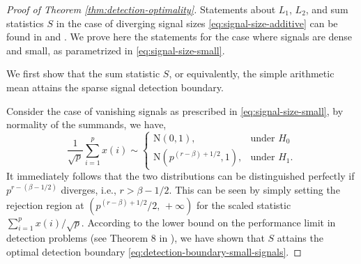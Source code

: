 \begin{proof}[Proof of Theorem \ref{thm:detection-optimality}]
Statements about $L_1$, $L_2$, and sum statistics $S$ in the case of diverging signal sizes \eqref{eq:signal-size-additive} can be found in \cite{fan1996test} and \cite{candes2018lecture}.
We prove here the statements for the case where signals are dense and small, as parametrized in \eqref{eq:signal-size-small}.

We first show that the sum statistic $S$, or equivalently, the simple arithmetic mean attains the sparse signal detection boundary.

Consider the case of vanishing signals as prescribed in \eqref{eq:signal-size-small}, by normality of the summands, we have, 
\begin{equation}
    \frac{1}{\sqrt{p}}\sum_{i=1}^p x(i) \sim 
    \begin{cases}
    \mathrm{N}(0, 1), & \text{under } H_0\\
    \mathrm{N}(p^{(r-\beta)+1/2}, 1), & \text{under }  H_1.
    \end{cases}
\end{equation}
It immediately follows that the two distributions can be distinguished perfectly if $p^{r-(\beta-1/2)}$ diverges, i.e., $r>\beta-1/2$. 
This can be seen by simply setting the rejection region at $(p^{(r-\beta)+1/2}/2,\,+\infty)$ for the scaled statistic $\sum_{i=1}^p x(i)/\sqrt{p} $.
According to the lower bound on the performance limit in detection problems (see Theorem 8 in \cite{cai2011optimal}), we have shown that $S$ attains the optimal detection boundary \eqref{eq:detection-boundary-small-signals}.


\end{proof}
